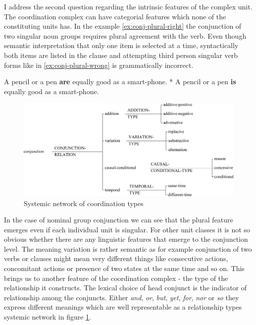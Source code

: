 I address the second question regarding the intrinsic features of the complex unit. The coordination complex can have categorial features which none of the constituting units has. In the example \ref{ex:conj-plural-right} the conjunction of two singular noun groups requires plural agreement with the verb. Even though semantic interpretation that only one item is selected at a time, syntactically both items are listed in the clause and attempting third person singular verb forms like in \ref{ex:conj-plural-wrong} is grammatically incorrect.
\begin{exe}
	\ex\label{ex:conj-plural-right}
	A pencil or a pen \textbf{are} equally good as a smart-phone.
	\ex\label{ex:conj-plural-wrong} * A pencil or a pen \textbf{is} equally good as a smart-phone.
\end{exe}
\begin{figure}[hbtp]
	\centering
	\includegraphics[width=\textwidth]{Figures/SFL-grammar/conjunction-system.pdf}
	\caption{Systemic network of coordination types}
	\label{fig:conj-rel-types}
\end{figure}

In the case of nominal group conjunction we can see that the plural feature emerges even if each individual unit is singular. For other unit classes it is not so obvious whether there are any linguistic features that emerge to the conjunction level. The meaning variation is rather semantic as for example conjunction of two verbs or clauses might mean very different things like consecutive actions, concomitant actions or presence of two states at the same time and so on. This brings us to another feature of the coordination complex - the type of the relationship it constructs. The lexical choice of head conjunct is the indicator of relationship among the conjuncts. Either \textit{and}, \textit{or}, \textit{but}, \textit{yet}, \textit{for}, \textit{nor} or \textit{so} they express different meanings which are well representable as a  relationship types systemic network in figure \ref{fig:conj-rel-types}.



